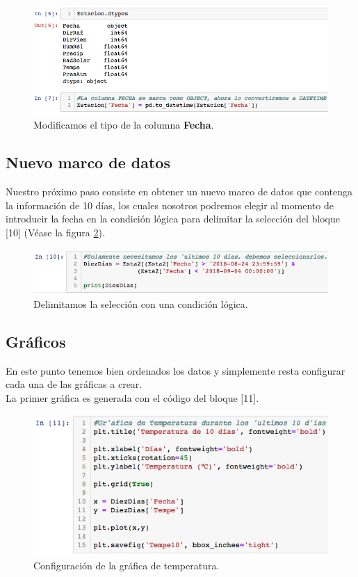 \documentclass[12pt]{article}
\begin{document}
\begin{figure}[h!]
	\center
	\includegraphics[scale=.6]{./Images/tipo}
	\caption{\label{fig:tipo} Modificamos el tipo de la columna \textbf{Fecha}.}
\end{figure}

\subsection{Nuevo marco de datos}

\noindent Nuestro próximo paso consiste en obtener un nuevo marco de datos que contenga la información de 10 días, los cuales nosotros podremos elegir al momento de introducir la fecha en la condición lógica para delimitar la selección del bloque [10] (Véase la figura \ref{fig:dias}).

\begin{figure}[h!]
	\center
	\includegraphics[scale=.6]{./Images/dias}
	\caption{\label{fig:dias} Delimitamos la selección con una condición lógica.}
\end{figure}

\subsection{Gráficos}

\noindent En este punto tenemos bien ordenados los datos y simplemente resta configurar cada una de las gráficas a crear. \\
\indent La primer gráfica es generada con el código del bloque [11].

\begin{figure}[h!]
	\center
	\includegraphics[scale=.6]{./Images/config1}
	\caption{\label{fig:config1} Configuración de la gráfica de temperatura.}
\end{figure}
\end{document}
